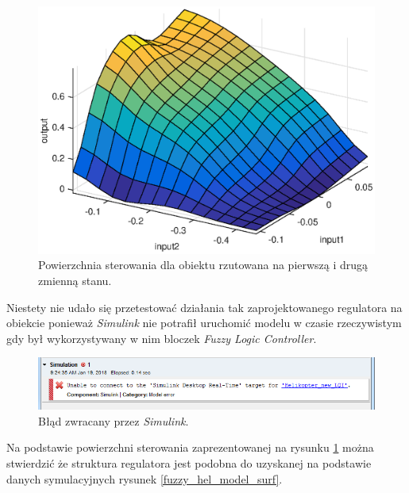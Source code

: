 %
%
\begin{figure}[h!]
	\centering
	\includegraphics[scale = 0.8]{fig/fuzzy_obiekt_surf.eps}
	\caption		
	{Powierzchnia sterowania dla obiektu rzutowana na pierwszą i drugą zmienną stanu.}
	\label{fuzzy_hel_obiekt_surf}
\end{figure} 
Niestety nie udało się przetestować działania tak zaprojektowanego regulatora na obiekcie ponieważ \textit{Simulink} nie potrafił uruchomić modelu w czasie rzeczywistym gdy był wykorzystywany w nim bloczek  \textit{Fuzzy Logic Controller}. \\
%
\begin{figure}[h!]
	\centering
	\includegraphics[scale = 0.8]{fig/bladSim.PNG}
	\caption		
	{Błąd zwracany przez \textit{Simulink}.}
	\label{bladSim}
\end{figure} 
\FloatBarrier
 Na podstawie powierzchni sterowania zaprezentowanej na rysunku \ref{fuzzy_hel_obiekt_surf} można stwierdzić że struktura regulatora jest podobna do uzyskanej na podstawie danych symulacyjnych rysunek \ref{fuzzy_hel_model_surf}. 
 